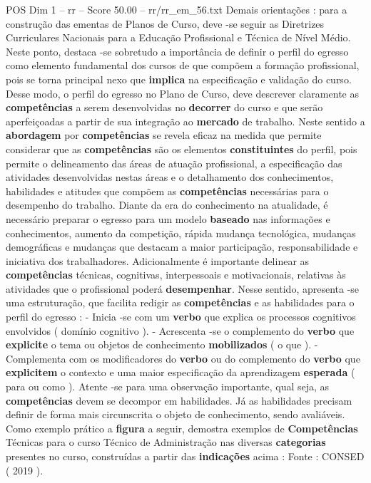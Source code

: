 \begin{textsample}{POS Dim 1 – rr – Score 50.00 – rr/rr\_em\_56.txt}
Demais orientações : para a construção das ementas de Planos de Curso, deve -se seguir as Diretrizes Curriculares Nacionais para a Educação Profissional e Técnica de Nível Médio.
Neste ponto, destaca -se sobretudo a importância de definir o perfil do egresso como elemento fundamental dos cursos de que compõem a formação profissional, pois se torna principal nexo que \textbf{implica} na especificação e validação do curso.
Desse modo, o perfil do egresso no Plano de Curso, deve descrever claramente as \textbf{competências} a serem desenvolvidas no \textbf{decorrer} do curso e que serão aperfeiçoadas a partir de sua integração ao \textbf{mercado} de trabalho.
Neste sentido a \textbf{abordagem} por \textbf{competências} se revela eficaz na medida que permite considerar que as \textbf{competências} são os elementos \textbf{constituintes} do perfil, pois permite o delineamento das áreas de atuação profissional, a especificação das atividades desenvolvidas nestas áreas e o detalhamento dos conhecimentos, habilidades e atitudes que compõem as \textbf{competências} necessárias para o desempenho do trabalho.
Diante da era do conhecimento na atualidade, é necessário preparar o egresso para um modelo \textbf{baseado} nas informações e conhecimentos, aumento da competição, rápida mudança tecnológica, mudanças demográficas e mudanças que destacam a maior participação, responsabilidade e iniciativa dos trabalhadores.
Adicionalmente é importante delinear as \textbf{competências} técnicas, cognitivas, interpessoais e motivacionais, relativas às atividades que o profissional poderá \textbf{desempenhar}.
Nesse sentido, apresenta -se uma estruturação, que facilita redigir as \textbf{competências} e as habilidades para o perfil do egresso : - Inicia -se com um \textbf{verbo} que explica os processos cognitivos envolvidos ( domínio cognitivo ). - Acrescenta -se o complemento do \textbf{verbo} que \textbf{explicite} o tema ou objetos de conhecimento \textbf{mobilizados} ( o que ). - Complementa com os modificadores do \textbf{verbo} ou do complemento do \textbf{verbo} que \textbf{explicitem} o contexto e uma maior especificação da aprendizagem \textbf{esperada} ( para ou como ).
Atente -se para uma observação importante, qual seja, as \textbf{competências} devem se decompor em habilidades.
Já as habilidades precisam definir de forma mais circunscrita o objeto de conhecimento, sendo avaliáveis.
Como exemplo prático a \textbf{figura} a seguir, demostra exemplos de \textbf{Competências} Técnicas para o curso Técnico de Administração nas diversas \textbf{categorias} presentes no curso, construídas a partir das \textbf{indicações} acima : Fonte : CONSED ( 2019 ).

\end{textsample}
